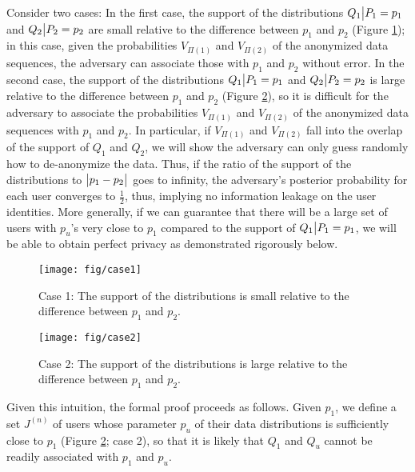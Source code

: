 Consider two cases: In the first case, the support of the distributions $Q_1\big{|} P_1=p_1$ and $Q_2\big{|} P_2=p_2$ are small relative to the difference between $p_1$ and $p_2$ (Figure \ref{fig:case1}); in this case, given the probabilities $V_{\Pi(1)}$ and $V_{\Pi(2)}$ of the anonymized data sequences, the adversary can associate those with $p_1$ and $p_2$ without error. In the second case, the support of the distributions $Q_1\big{|} P_1=p_1$ and $Q_2\big{|} P_2=p_2$ is large relative to the difference between $p_1$ and $p_2$ (Figure \ref{fig:case2}), so it is difficult for the adversary to associate the probabilities $V_{\Pi(1)}$ and $V_{\Pi(2)}$ of the anonymized data sequences with $p_1$ and $p_2$. In particular, if $V_{\Pi(1)}$ and $V_{\Pi(2)}$ fall into the overlap of the support of $Q_1$ and $Q_2$, we will show the adversary can only guess randomly how to de-anonymize the data. Thus, if the ratio of the support of the distributions to $\big{|}p_1-p_2\big{|}$ goes to infinity, the adversary's posterior probability for each user converges to $\frac{1}{2}$, thus, implying no information leakage on the user identities. More generally, if we can guarantee that there will be a large set of users with $p_u$'s very close to $p_1$ compared to the support of $Q_1\big{|} P_1=p_1$, we will be able to obtain perfect privacy as demonstrated rigorously below.

\begin{figure}[h]
	\centering
	\texttt{[image: fig/case1]}
	\caption{Case 1: The support of the distributions is small relative to the difference between $p_1$ and $p_2$.}
	\label{fig:case1}
\end{figure}

\begin{figure}[h]
	\centering
	\texttt{[image: fig/case2]}
	\caption{Case 2: The support of the distributions is large relative to the difference between $p_1$ and $p_2$.}
	\label{fig:case2}
\end{figure}

Given this intuition, the formal proof proceeds as follows. Given $p_1$, we define a set $J^{(n)}$ of users whose parameter $p_u$ of their data distributions is sufficiently close to $p_1$ (Figure \ref{fig:case2}; case 2), so that it is likely that $Q_1$ and $Q_u$ cannot be readily associated with $p_1$ and $p_u$.

